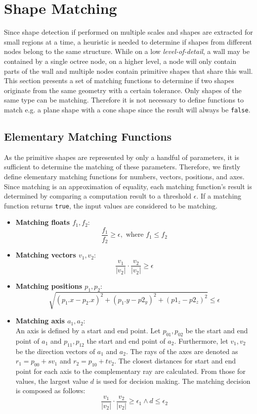 \section{Shape Matching}
\label{sec:shapeMatching}
Since shape detection if performed on multiple scales and shapes are extracted for small regions at a time, a heuristic is needed to determine if shapes from different nodes belong to the same structure. While on a low \textit{level-of-detail}, a wall may be contained by a single octree node, on a higher level, a node will only contain parts of the wall and multiple nodes contain primitive shapes that share this wall. This section presents a set of matching functions to determine if two shapes originate from the same geometry with a certain tolerance. Only shapes of the same type can be matching. Therefore it is not necessary to define functions to match e.g. a plane shape with a cone shape since the result will always be \verb|false|. 


\subsection{Elementary Matching Functions}
\label{sec:elementarMatchingFuns}

As the primitive shapes are represented by only a handful of parameters, it is sufficient to determine the matching of these parameters. Therefore, we firstly define elementary matching functions for numbers, vectors, positions, and axes. Since matching is an approximation of equality, each matching function's result is determined by comparing a computation result to a threshold $\epsilon$. If a matching function returns \verb|true|, the input values are considered to be matching. 

\begin{itemize}
    \item \textbf{Matching floats $f_1, f_2$}: 
        $$\frac{f_1}{f_2} \geq \epsilon, \textrm{ where } f_1 \leq f_2$$  
    \item \textbf{Matching vectors $v_1, v_2$}: 
        $$\frac{v_1}{|v_2|} \cdot \frac{v_2}{|v_2|} \geq \epsilon$$
    \item \textbf{Matching positions $p_1, p_2$}: 
        $$\sqrt{(p_1.x - p_2.x)^2 + (p_1.y - p2_y)^2 + (p1_z - p2_z)^2} \leq \epsilon$$
    \item \textbf{Matching axis $a_1, a_2$}: 
    \\
    An axis is defined by a start and end point. Let $p_{01},p_{02}$ be the start and end point of $a_1$ and $p_{11}, p_{12}$ the start and end point of $a_2$. Furthermore, let $v_1, v_2$ be the direction vectors of $a_1$ and $a_2$. The rays of the axes are denoted as $r_1 = p_{00} + sv_1$ and $r_2 = p_{10} + tv_2$. The closest distances for start and end point for each axis to the complementary ray are calculated. From those for values, the largest value $d$ is used for decision making. The matching decision is composed as follows: 
        $$\frac{v_1}{|v_2|} \cdot \frac{v_2}{|v_2|} \geq \epsilon_1 \land d \leq \epsilon_2$$
\end{itemize}


